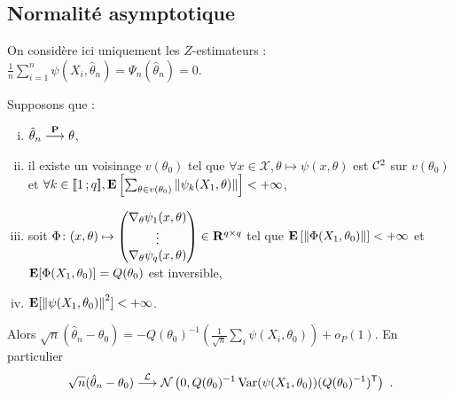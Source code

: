 \subsection{Normalité asymptotique}

	On considère ici uniquement les $Z$-estimateurs : $\frac{1}{n} \sum_{i = 1}^n \psi(X_i,\hat{\theta}_n) = \Psi_n(\hat{\theta}_n) = 0$.

	\begin{thm}
		Supposons que :
		\begin{enumerate}[(i)]
			\item $\hat{\theta}_n \overset{\mathbf{P}}{\longrightarrow} \theta$,
			\item il existe un voisinage $v(\theta_0)$ tel que $\forall x \in \mathcal{X}, \theta \mapsto \psi(x,\theta)$ est $\mathcal{C}^2$ sur $v(\theta_0)$ et $\forall k \in \mathopen{}\mathclose{\left[\![1\mathclose{}\mathpunct{};q\right]\!]}, \mathbf{E} \left[ \sum_{\theta \in v(\theta_0)} \left\lVert\psi_k(X_1,\theta)\right\rVert \right] < +\infty$,
			\item soit $\Phi \colon (x,\theta) \mapsto \begin{pmatrix} \nabla_\theta \psi_1(x,\theta) \\ \vdots \\ \nabla_\theta \psi_q(x,\theta) \end{pmatrix} \in \mathbf{R}^{q \times q}$ tel que $\mathbf{E} \left[ \left\lVert\Phi(X_1,\theta_0)\right\rVert \right] < +\infty$ et $\mathbf{E}[ \Phi(X_1,\theta_0) ] = Q(\theta_0)$ est inversible,
			\item $\mathbf{E}[ \left\lVert\psi(X_1,\theta_0)\right\rVert^2 ] < +\infty$.
		\end{enumerate}
		Alors $\sqrt{n}(\hat{\theta}_n - \theta_0) = -Q(\theta_0)^{-1} \left( \frac{1}{\sqrt{n}} \sum_i \psi(X_i,\theta_0) \right) + o_P(1)$.
		En particulier
		$$\sqrt{n}(\hat{\theta}_n - \theta_0) \overset{\mathcal{L}}{\longrightarrow} \mathcal{N} \left( 0, Q(\theta_0)^{-1} \operatorname{Var}(\psi(X_1,\theta_0)) (Q(\theta_0)^{-1})^\mathsf{T} \right)\ .$$
	\end{thm}
